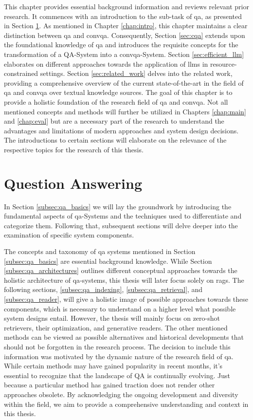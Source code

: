 This chapter provides essential background information and reviews relevant prior research. It commences with an introduction to the sub-task of \gls{qa}, as presented in Section \ref*{sec:qa}. As mentioned in Chapter \ref{chap:intro}, this chapter maintains a clear distinction between \gls{qa} and \gls{convqa}. Consequently, Section \ref{sec:cqa} extends upon the foundational knowledge of \gls*{qa} and introduces the requisite concepts for the transformation of a QA-System into a \gls{convqa}-System. Section \ref{sec:efficient_llm} elaborates on different approaches towards the application of \gls{llm}s in resource-constrained settings. Section \ref{sec:related_work} delves into the related work, providing a comprehensive overview of the current state-of-the-art in the field of \gls{qa} and \gls{convqa} over textual knowledge sources. The goal of this chapter is to provide a holistic foundation of the research field of \gls{qa} and \gls{convqa}. Not all mentioned concepts and methods will further be utilized in Chapters \ref{chap:main} and \ref{chap:eval} but are a necessary part of the research to understand the advantages and limitations of modern approaches and system design decisions. The introductions to certain sections will elaborate on the relevance of the respective topics for the research of this thesis.

\section{Question Answering}
\label{sec:qa}

In Section \ref{subsec:qa_basics} we will lay the groundwork by introducing the fundamental aspects of \gls{qa}-Systems and the techniques used to differentiate and categorize them. Following that, subsequent sections will delve deeper into the examination of specific system components.

The concepts and taxonomy of \gls{qa} systems mentioned in Section \ref{subsec:qa_basics} are essential background knowledge. While Section \ref{subsec:qa_architectures} outlines different conceptual approaches towards the holistic architecture of \gls{qa}-systems, this thesis will later focus solely on \gls{rag}s. The following sections, \ref{subsec:qa_indexing}, \ref{subsec:qa_retrieval}, and \ref{subsec:qa_reader}, will give a holistic image of possible approaches towards these components, which is necessary to understand on a higher level what possible system designs entail. However, the thesis will mainly focus on zero-shot retrievers, their optimization, and generative readers. The other mentioned methods can be viewed as possible alternatives and historical developments that should not be forgotten in the research process. The decision to include this information was motivated by the dynamic nature of the research field of \gls{qa}. While certain methods may have gained popularity in recent months, it's essential to recognize that the landscape of QA is continually evolving. Just because a particular method has gained traction does not render other approaches obsolete. By acknowledging the ongoing development and diversity within the field, we aim to provide a comprehensive understanding and context in this thesis.



